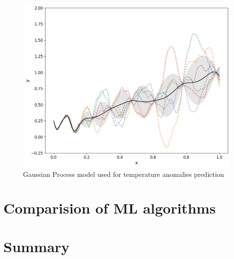 \begin{figure}[h]
  \includegraphics[width=\linewidth]{img/gaussian-process.png}
  \caption{Gaussian Process model used for temperature anomalies prediction}
  \label{fig:gaussian-process}
\end{figure}

\section{Comparision of ML algorithms}

\section{Summary}
